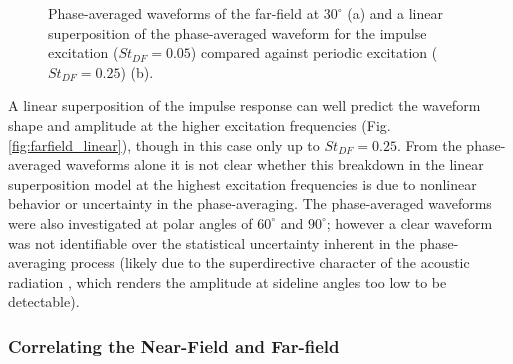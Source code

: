\documentclass[english]{aiaa-tc}
\begin{document}
\begin{figure}
	\begin{centering}
	\end{centering}
	\caption{Phase-averaged waveforms of the far-field at $30^\circ$ (a) and a linear superposition of the phase-averaged waveform for the impulse excitation ($St_{DF} = 0.05$) compared against periodic excitation ($St_{DF} = 0.25$) (b).}
\end{figure}

A linear superposition of the impulse response can well predict the waveform shape and amplitude at the higher excitation frequencies (Fig. \ref{fig:farfield_linear}), though in this case only up to $St_{DF}  = 0.25$.
From the phase-averaged waveforms alone it is not clear whether this breakdown in the linear superposition model at the highest excitation frequencies is due to nonlinear behavior or uncertainty in the phase-averaging.
The phase-averaged waveforms were also investigated at polar angles of $60^\circ$ and $90^\circ$; however a clear waveform was not identifiable over the statistical uncertainty inherent in the phase-averaging process (likely due to the superdirective character of the acoustic radiation \cite{Crighton1990}, which renders the amplitude at sideline angles too low to be detectable).

\subsubsection{Correlating the Near-Field and Far-field}
\end{document}

